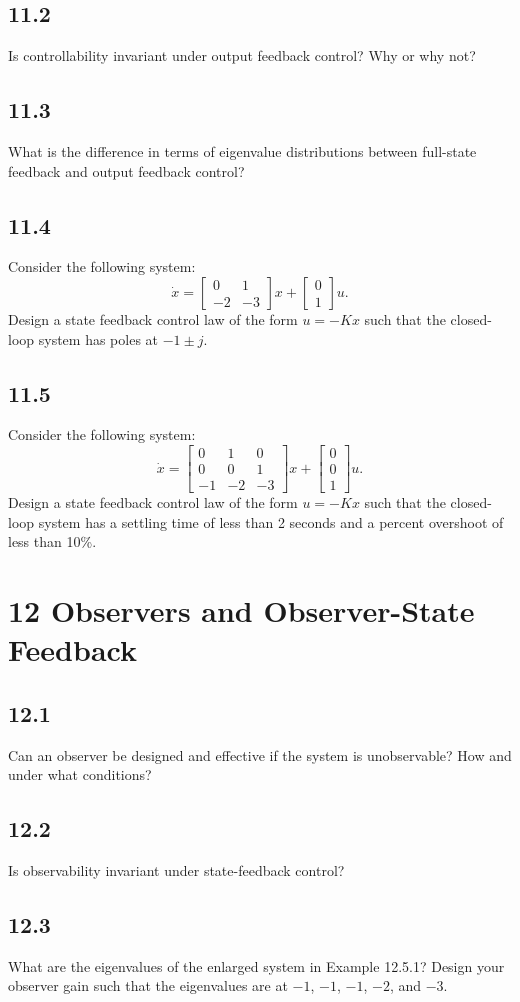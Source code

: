 \documentclass{article}
\newcommand{\problem}[2]{\subsection*{#1}}
\begin{document}
\problem{11.2}{state-feedback-concepts}
Is controllability invariant under output feedback control? Why or why not?

\problem{11.3}{state-feedback-concepts}
What is the difference in terms of eigenvalue distributions between full-state feedback and output feedback control?

\problem{11.4}{pole-placement-drills}
Consider the following system:
\[
\dot{x} = \begin{bmatrix} 0 & 1 \\ -2 & -3 \end{bmatrix} x + \begin{bmatrix} 0 \\ 1 \end{bmatrix} u.
\]
Design a state feedback control law of the form $u = -Kx$ such that the closed-loop system has poles at $-1 \pm j$.

\problem{11.5}{pole-placement-drills}
Consider the following system:
\[
\dot{x} = \begin{bmatrix} 0 & 1 & 0 \\ 0 & 0 & 1 \\ -1 & -2 & -3 \end{bmatrix} x + \begin{bmatrix} 0 \\ 0 \\ 1 \end{bmatrix} u.
\]
Design a state feedback control law of the form $u = -Kx$ such that the closed-loop system has a settling time of less than 2 seconds and a percent overshoot of less than 10\%.

\section*{12 Observers and Observer-State Feedback}

\problem{12.1}{observer-concepts}
Can an observer be designed and effective if the system is unobservable? How and under what conditions?

\problem{12.2}{observer-concepts}
Is observability invariant under state-feedback control?

\problem{12.3}{}
What are the eigenvalues of the enlarged system in Example 12.5.1? Design your observer gain such that the eigenvalues are at $-1$, $-1$, $-1$, $-2$, and $-3$.
\end{document}
